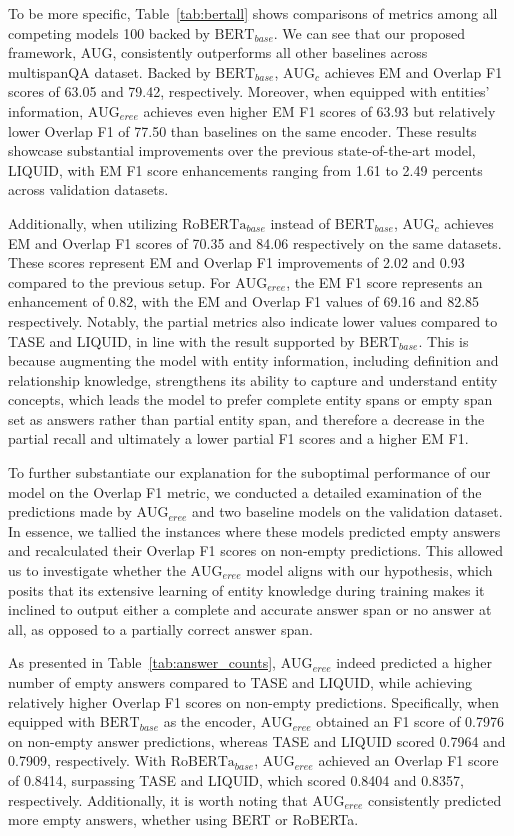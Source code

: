 To be more specific, Table~\ref{tab:bertall} shows comparisons of metrics among all competing models 100 backed by $\text{BERT}_{base}$. We can see that our proposed framework, AUG, consistently outperforms all other baselines across multispanQA dataset. Backed by $\text{BERT}_{base}$, $\text{AUG}_{c}$ achieves EM and Overlap F1 scores of 63.05 and 79.42, respectively. Moreover, when equipped with entities’ information,  $\text{AUG}_{eree}$ achieves even higher EM F1 scores of 63.93 but relatively lower Overlap F1 of 77.50 than baselines on the same encoder. These results showcase substantial improvements over the previous state-of-the-art model, LIQUID, with EM F1 score enhancements ranging from 1.61 to 2.49 percents across validation datasets. 

Additionally, when utilizing $\text{RoBERTa}_{base}$ instead of $\text{BERT}_{base}$, $\text{AUG}_{c}$ achieves EM and Overlap F1 scores of 70.35 and 84.06 respectively on the same datasets. These scores represent EM and Overlap F1 improvements of 2.02 and 0.93 compared to the previous setup. For  $\text{AUG}_{eree}$, the EM F1 score represents an enhancement of 0.82, with the EM and Overlap F1 values of 69.16 and 82.85 respectively. Notably, the partial metrics also indicate lower values compared to TASE and LIQUID, in line with the result supported by $\text{BERT}_{base}$. This is because augmenting the model with entity information, including definition and relationship knowledge, strengthens its ability to capture and understand entity concepts, which leads the model to prefer complete entity spans or empty span set as answers rather than partial entity span, and therefore a decrease in the partial recall and ultimately a lower partial F1 scores and a higher EM F1.


To further substantiate our explanation for the suboptimal performance of our model on the Overlap F1 metric, we conducted a detailed examination of the predictions made by $\text{AUG}_{eree}$ and two baseline models on the validation dataset. In essence, we tallied the instances where these models predicted empty answers and recalculated their Overlap F1 scores on non-empty predictions. This allowed us to investigate whether the $\text{AUG}_{eree}$ model aligns with our hypothesis, which posits that its extensive learning of entity knowledge during training makes it inclined to output either a complete and accurate answer span or no answer at all, as opposed to a partially correct answer span.

As presented in Table~\ref{tab:answer_counts}, $\text{AUG}_{eree}$ indeed predicted a higher number of empty answers compared to TASE and LIQUID, while achieving relatively higher Overlap F1 scores on non-empty predictions. Specifically, when equipped with $\text{BERT}_{base}$ as the encoder, $\text{AUG}_{eree}$ obtained an F1 score of 0.7976 on non-empty answer predictions, whereas TASE and LIQUID scored 0.7964 and 0.7909, respectively. With $\text{RoBERTa}_{base}$, $\text{AUG}_{eree}$ achieved an Overlap F1 score of 0.8414, surpassing TASE and LIQUID, which scored 0.8404 and 0.8357, respectively. Additionally, it is worth noting that $\text{AUG}_{eree}$ consistently predicted more empty answers, whether using BERT or RoBERTa.

